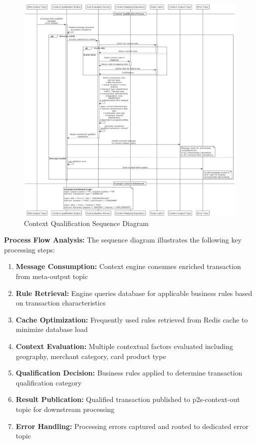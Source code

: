 \begin{figure}[H]
    \centering
    \includegraphics[width=1.05\textwidth]{out/diagrams/plantuml/in/context-sequence-diagram/P2S Context Qualification Process.png}
    \caption{Context Qualification Sequence Diagram}
    \label{fig:context_qualification_sequence}
\end{figure}   

\textbf{Process Flow Analysis:}
The sequence diagram illustrates the following key processing steps:

\begin{enumerate}
    \item \textbf{Message Consumption:} Context engine consumes enriched transaction from meta-output topic
    \item \textbf{Rule Retrieval:} Engine queries database for applicable business rules based on transaction characteristics
    \item \textbf{Cache Optimization:} Frequently used rules retrieved from Redis cache to minimize database load
    \item \textbf{Context Evaluation:} Multiple contextual factors evaluated including geography, merchant category, card product type
    \item \textbf{Qualification Decision:} Business rules applied to determine transaction qualification category
    \item \textbf{Result Publication:} Qualified transaction published to p2s-context-out topic for downstream processing
    \item \textbf{Error Handling:} Processing errors captured and routed to dedicated error topic
\end{enumerate}

